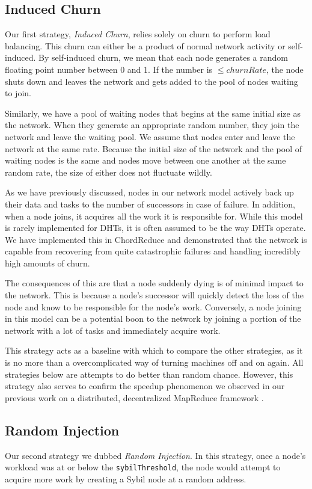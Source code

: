 \documentclass[10pt,conference]{IEEEtran}
\begin{document}
\subsection{Induced Churn}
\label{sec:strat-churn}
Our first strategy, \textit{Induced Churn}, relies solely on churn to perform load balancing.
This churn can either be a product of normal network activity or self-induced.
By self-induced churn, we mean that each node generates a random floating point number between 0 and 1.
If the number is $\leq churnRate$, the node shuts down and leaves the network and gets added to the pool of nodes waiting to join.

Similarly, we have a pool of waiting nodes that begins at the same initial size as the network.
When they generate an appropriate random number, they join the network and leave the waiting pool.
We assume that nodes enter and leave the network at the same rate.
Because the initial size of the network and the pool of waiting nodes is the same and nodes move between one another at the same random rate, the size of either does not fluctuate wildly.

As we have previously discussed, nodes in our network model actively back up their data and tasks to the number of successors in case of failure.
In addition, when a node joins, it acquires all the work it is responsible for.
While this model is rarely implemented for DHTs, it is often assumed to be the way DHTs operate. 
We have implemented this in ChordReduce\cite{chordreduce} and demonstrated that the network is capable from recovering from quite catastrophic failures and handling incredibly high amounts of churn.

The consequences of this are that a node suddenly dying is of minimal impact to the network.
This is because a node's successor will quickly detect the loss of the node and know to be responsible for the node's work.
Conversely, a node joining in this model can be a potential boon to the network by joining a portion of the network with a lot of tasks and immediately acquire work.

This strategy acts as a baseline with which to compare the other strategies, as it is no more than a overcomplicated way of turning machines off and on again. 
All strategies below are attempts to do better than random chance.
However, this strategy also serves to confirm the speedup phenomenon we observed in our previous work on a distributed, decentralized MapReduce framework \cite{chordreduce}.

\subsection{Random Injection}
\label{sec:strat-randomInject}
Our second strategy we dubbed \textit{Random Injection}.
In this strategy, once a node's workload was at or below the \texttt{sybilThreshold}, the node would attempt to acquire more work by creating a Sybil node at a random address.
\end{document}
